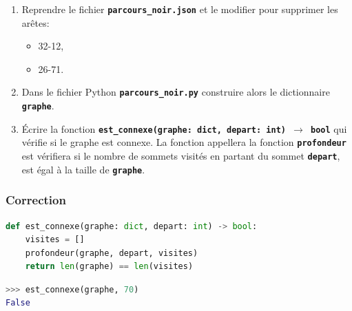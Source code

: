 \documentclass[svgnames,11pt]{beamer}
\begin{document}
\begin{frame}
\begin{center}
\begin{tikzpicture}[scale=0.9, transform shape]
        \end{tikzpicture}
    \end{center}
    

\end{frame}
\begin{frame}
    \frametitle{}

\begin{activite}
\begin{enumerate}
    \item Reprendre le fichier \textbf{\texttt{parcours\_noir.json}} et le modifier pour supprimer les arêtes:
    \begin{itemize}
        \item 32-12,
        \item 26-71.
    \end{itemize}
    \item Dans le fichier Python \textbf{\texttt{parcours\_noir.py}} construire alors le dictionnaire \textbf{\texttt{graphe}}.
    \item Écrire la fonction \textbf{\texttt{est\_connexe(graphe: dict, depart: int) $\rightarrow$ bool}} qui vérifie si le graphe est connexe. La fonction appellera la fonction \textbf{\texttt{profondeur}} est vérifiera si le nombre de sommets visités en partant du sommet \textbf{\texttt{depart}}, est égal à la taille de \textbf{\texttt{graphe}}.
\end{enumerate}
\end{activite}

\end{frame}
\begin{frame}[fragile]
    \frametitle{Correction}

\begin{center}
\begin{lstlisting}[language=Python , basicstyle=\ttfamily\small, xleftmargin=0.2em, xrightmargin=0em]
def est_connexe(graphe: dict, depart: int) -> bool:
    visites = []
    profondeur(graphe, depart, visites)
    return len(graphe) == len(visites)
\end{lstlisting}

\begin{lstlisting}[language=Python , basicstyle=\ttfamily\small, xleftmargin=2em, xrightmargin=2em]
>>> est_connexe(graphe, 70)
False
\end{lstlisting}
\end{center}

\end{frame}
\end{document}
